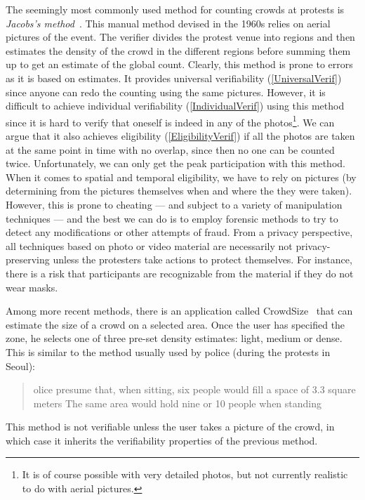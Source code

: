 The seemingly most commonly used method for counting crowds at protests is \emph{Jacobs's method}~\cite{2016DemonstrationsInSeoul,BBCHowToCountProtestNumbers,HowWillWeKnowTrumpInauguralCrowdSize,TheXManMarch,TheCrowdNumbersGame}.
This manual method devised in the 1960s relies on aerial pictures of the event.
The verifier divides the protest venue into regions and then estimates the density of the crowd in the different regions before summing them up to get an estimate of the global count.
Clearly, this method is prone to errors as it is based on estimates.
It provides universal verifiability (\cref{UniversalVerif}) since anyone can redo the counting using the same pictures.
However, it is difficult to achieve individual verifiability (\cref{IndividualVerif}) using this method since it is hard to verify that oneself is indeed in any of the photos\footnote{It is of course possible with very detailed photos, but not currently realistic to do with aerial pictures.}.
We can argue that it also achieves eligibility (\cref{EligibilityVerif}) if all the photos are taken at the same point in time with no overlap, since then no one can be counted twice.
Unfortunately, we can only get the peak participation with this method.
When it comes to spatial and temporal eligibility, we have to rely on pictures (\eg by determining from the pictures themselves when and where the they were taken).
However, this is prone to cheating --- and subject to a variety of manipulation techniques --- and the best we can do is to employ forensic methods to try to detect any modifications or other attempts of fraud.
From a privacy perspective, all techniques based on photo or video material are necessarily not privacy-preserving unless the protesters take actions to protect themselves.
For instance, there is a risk that participants are recognizable from the material if they do not wear masks.

Among more recent methods, there is an application called CrowdSize~\cite{CrowdSize} that can estimate the size of a crowd on a selected area.
Once the user has specified the zone, he selects one of three pre-set density estimates: light, medium or dense.
This is similar to the method usually used by police (\eg during the protests in Seoul):
\blockcquote{2016DemonstrationsInSeoul}{%
  olice presume that, when sitting, six people would fill a space of 3.3 square meters
  \textelp{}
  The same area would hold nine or 10 people when standing%
}.
This method is not verifiable unless the user takes a picture of the crowd, in which case it inherits the verifiability properties of the previous method.

